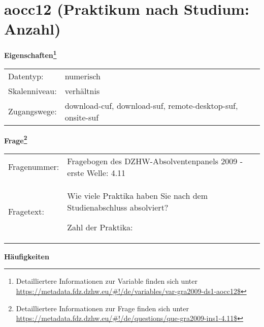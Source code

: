 
    \setcounter{footnote}{0}

    \vspace*{-1.8cm}
	\section{aocc12 (Praktikum nach Studium: Anzahl)}
	\label{section:aocc12}



    \vspace*{0.5cm}
    \noindent\textbf{Eigenschaften\footnote{Detailliertere Informationen zur Variable finden sich unter
		\url{https://metadata.fdz.dzhw.eu/\#!/de/variables/var-gra2009-ds1-aocc12$}}}\\
	\begin{tabularx}{\hsize}{@{}lX}
	Datentyp: & numerisch \\
	Skalenniveau: & verhältnis \\
	Zugangswege: &
	  download-cuf, 
	  download-suf, 
	  remote-desktop-suf, 
	  onsite-suf
 \\
    \end{tabularx}



				\vspace*{0.5cm}
                \noindent\textbf{Frage\footnote{Detailliertere Informationen zur Frage finden sich unter
		              \url{https://metadata.fdz.dzhw.eu/\#!/de/questions/que-gra2009-ins1-4.11$}}}\\
				\begin{tabularx}{\hsize}{@{}lX}
					Fragenummer: &
					  Fragebogen des DZHW-Absolventenpanels 2009 - erste Welle:
					  4.11
 \\
					Fragetext: & Wie viele Praktika haben Sie nach dem Studienabschluss absolviert?\par  Zahl der Praktika: \\
				\end{tabularx}





        		\vspace*{0.5cm}
                \noindent\textbf{Häufigkeiten}


